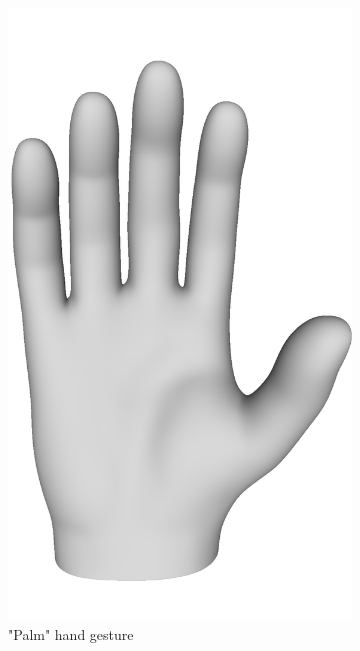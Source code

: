 \documentclass{ieeeaccess}
\begin{document}
\begin{figure}
     \centering
     \begin{subfigure}[b]{0.2\textwidth}
         \centering
         \includegraphics[width=\textwidth]{smith4.png}
         \caption{"Palm" hand gesture}
         \label{fig:palm}
     \end{subfigure}
     \hfill
     \begin{subfigure}[b]{0.2\textwidth}
         \centering

\end{subfigure}
\end{figure}
\end{document}
